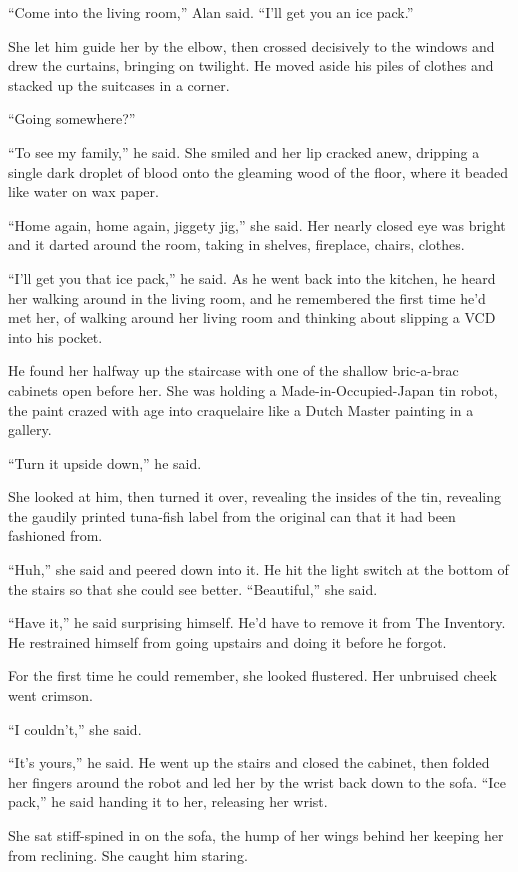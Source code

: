 ``Come into the living room,'' Alan said.  ``I'll get you an ice
pack.''

She let him guide her by the elbow, then crossed decisively to the
windows and drew the curtains, bringing on twilight.  He moved aside
his piles of clothes and stacked up the suitcases in a corner.

``Going somewhere?''

``To see my family,'' he said.  She smiled and her lip cracked anew,
dripping a single dark droplet of blood onto the gleaming wood of the
floor, where it beaded like water on wax paper.

``Home again, home again, jiggety jig,'' she said.  Her nearly closed
eye was bright and it darted around the room, taking in shelves,
fireplace, chairs, clothes.

``I'll get you that ice pack,'' he said.  As he went back into the
kitchen, he heard her walking around in the living room, and he
remembered the first time he'd met her, of walking around her living
room and thinking about slipping a VCD into his pocket.

He found her halfway up the staircase with one of the shallow
bric-a-brac cabinets open before her.  She was holding a
Made-in-Occupied-Japan tin robot, the paint crazed with age into
craquelaire like a Dutch Master painting in a gallery.

``Turn it upside down,'' he said.

She looked at him, then turned it over, revealing the insides of the
tin, revealing the gaudily printed tuna-fish label from the original
can that it had been fashioned from.

``Huh,'' she said and peered down into it.  He hit the light switch at
the bottom of the stairs so that she could see better.  ``Beautiful,''
she said.

``Have it,'' he said surprising himself.  He'd have to remove it from
The Inventory.  He restrained himself from going upstairs and doing it
before he forgot.

For the first time he could remember, she looked flustered.  Her
unbruised cheek went crimson.

``I couldn't,'' she said.

``It's yours,'' he said.  He went up the stairs and closed the
cabinet, then folded her fingers around the robot and led her by the
wrist back down to the sofa.  ``Ice pack,'' he said handing it to her,
releasing her wrist.

She sat stiff-spined in on the sofa, the hump of her wings behind her
keeping her from reclining.  She caught him staring.

